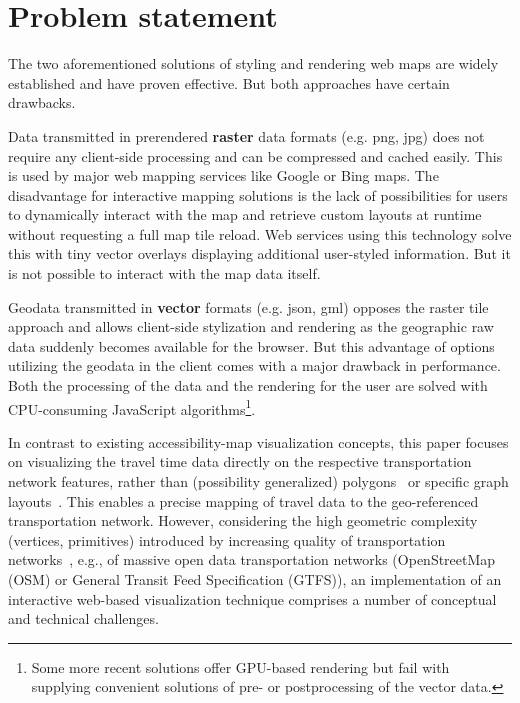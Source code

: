   \section{Problem statement}
    The two aforementioned solutions of styling and rendering web maps are widely established and have proven effective. But both approaches have certain drawbacks.\par
    Data transmitted in prerendered \textbf{raster} data formats (e.g. png, jpg) does not require any client-side processing and can be compressed and cached easily. This is used by major web mapping services like Google or Bing maps. The disadvantage for interactive mapping solutions is the lack of possibilities for users to dynamically interact with the map and retrieve custom layouts at runtime without requesting a full map tile reload. Web services using this technology solve this with tiny vector overlays displaying additional user-styled information. But it is not possible to interact with the map data itself.\par
    Geodata transmitted in \textbf{vector} formats (e.g. json, gml) opposes the raster tile approach and allows client-side stylization and rendering as the geographic raw data suddenly becomes available for the browser. But this advantage of options utilizing the geodata in the client comes with a major drawback in performance. Both the processing of the data and the rendering for the user are solved with CPU-consuming JavaScript algorithms\footnote{Some more recent solutions offer GPU-based rendering but fail with supplying convenient solutions of pre- or postprocessing of the vector data.}.\par

    In contrast to existing accessibility-map visualization concepts, this paper focuses
    on visualizing the travel time data directly on the respective transportation network
    features, rather than (possibility generalized) polygons~\cite{Glander2010} or
    specific graph layouts~\cite{Krause2012}. This enables a precise mapping of travel
    data to the geo-referenced transportation network. However, considering the high
    geometric complexity (vertices, primitives) introduced by increasing quality of
    transportation networks~\cite{Zielstra2010}, e.g., of massive open data transportation
    networks (OpenStreetMap (OSM) or General Transit Feed Specification (GTFS)), an
    implementation of an interactive web-based visualization technique comprises a
    number of conceptual and technical challenges.

